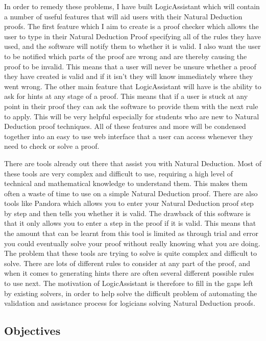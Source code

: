 In order to remedy these problems, I have built LogicAssistant which will contain a number of useful features that will aid users with their Natural Deduction proofs. The first feature which I aim to create is a proof checker which allows the user to type in their Natural Deduction Proof specifying all of the rules they have used, and the software will notify them to whether it is valid. I also want the user to be notified which parts of the proof are wrong and are thereby causing the proof to be invalid. This means that a user will never be unsure whether a proof they have created is valid and if it isn't they will know immediately where they went wrong. The other main feature that LogicAssistant will have is the ability to ask for hints at any stage of a proof. This means that if a user is stuck at any point in their proof they can ask the software to provide them with the next rule to apply. This will be very helpful especially for students who are new to Natural Deduction proof techniques. All of these features and more will be condensed together into an easy to use web interface that a user can access whenever they need to check or solve a proof. 

There are tools already out there that assist you with Natural Deduction. Most of these tools are very complex and difficult to use, requiring a high level of technical and mathematical knowledge to understand them. This makes them often a waste of time to use on a simple Natural Deduction proof. There are also tools like Pandora\cite{pandora} which allows you to enter your Natural Deduction proof step by step and then tells you whether it is valid. The drawback of this software is that it only allows you to enter a step in the proof if it is valid. This means that the amount that can be learnt from this tool is limited as through trial and error you could eventually solve your proof without really knowing what you are doing. The problem that these tools are trying to solve is quite complex and difficult to solve. There are lots of different rules to consider at any part of the proof, and when it comes to generating hints there are often several different possible rules to use next. The motivation of LogicAssistant is therefore to fill in the gaps left by existing solvers, in order to help solve the difficult problem of automating the validation and assistance process for logicians solving Natural Deduction proofs.

\subsection{Objectives}

